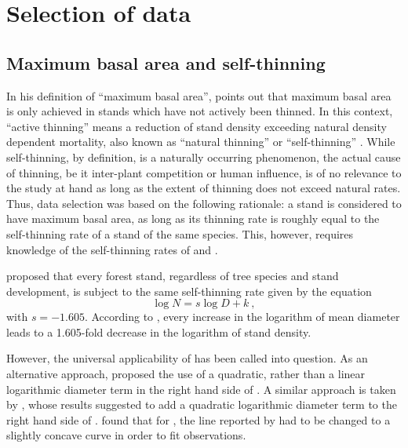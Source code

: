 \section{Selection of data}

\subsection{Maximum basal area and self-thinning}

In his definition of ``maximum basal area'', \textcite{Assmann1970} points out that maximum basal area is only achieved in stands which have not actively been thinned.  In this context, ``active thinning'' means a reduction of stand density exceeding natural density dependent mortality, also known as ``natural thinning'' \parencite{SAF1958} or ``self-thinning'' \parencite{Roehrig1992}.  While self-thinning, by definition, is a naturally occurring phenomenon, the actual cause of thinning, be it inter-plant competition or human influence, is of no relevance to the study at hand as long as the extent of thinning does not exceed natural rates.  Thus, data selection was based on the following rationale: a stand is considered to have maximum basal area, as long as its thinning rate is roughly equal to the self-thinning rate of a stand of the same species.  This, however, requires knowledge of the self-thinning rates of \beech{} and \spruce{}.

\textcite{Reineke1933} proposed that every forest stand, regardless of tree species and stand development, is subject to the same self-thinning rate given by the equation
\begin{equation}
  \label{eq:reineke}
  \log N = s \log D + k ~,
\end{equation}
with \(s = -1.605\).  According to \textcite{Reineke1933}, every increase in the logarithm of mean diameter leads to a \num{1.605}-fold decrease in the logarithm of stand density.

However, the universal applicability of  has been called into question.  As an alternative approach, \textcite{Charru2012} proposed the use of a quadratic, rather than a linear logarithmic diameter term in the right hand side of . A similar approach is taken by \textcite{Schuetz2008,Schuetz2010,Zeide1995}, whose results suggested to add a quadratic logarithmic diameter term to the right hand side of .  \textcite{Meyer1938} found that for \ponderosa{}, the line reported by \textcite{Reineke1933} had to be changed to a slightly concave curve in order to fit observations.  

